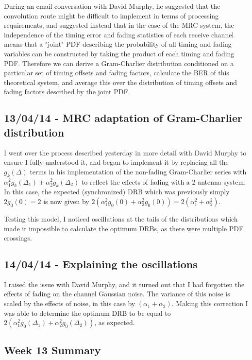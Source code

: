 During an email conversation with David Murphy, he suggested that the
convolution route might be difficult to implement in terms of processing
requirements, and suggested instead that in the case of the MRC system,
the independence of the timing error and fading statistics of each
receive channel means that a "joint" PDF describing the probability of
all timing and fading variables can be constructed by taking the product
of each timing and fading PDF. Therefore we can derive a Gram-Charlier
distribution conditioned on a particular set of timing offsets and
fading factors, calculate the BER of this theoretical system, and
average this over the distribution of timing offsets and fading factors
described by the joint PDF.

\subsection{13/04/14 - MRC adaptation of Gram-Charlier distribution}

I went over the process described yesterday in more detail with David Murphy to ensure I fully understood it,
and began to implement it by replacing all the $g_k(\Delta)$ terms in
his implementation of the non-fading Gram-Charlier series with
$\alpha_1^2 g_k(\Delta_1) + \alpha_2^2 g_k(\Delta_2)$ to reflect the
effects of fading with a 2 antenna system. In this case, the expected
(synchronized) DRB which was previously simply $2 g_0(0) = 2$ is now
given by
$2(\alpha_1^2 g_0(0) + \alpha_2^2 g_0(0)) = 2(\alpha_1^2 + \alpha_2^2)$.

Testing this model, I noticed oscillations at the tails of the
distributions which made it impossible to calculate the optimum DRBs, as
there were multiple PDF crossings.

\subsection{14/04/14 - Explaining the oscillations}

I raised the issue with David Murphy, and it turned out that I had forgotten the
effects of fading on the channel Gaussian noise. The variance of this
noise is scaled by the effects of noise, in this case by
$(\alpha_1 + \alpha_2)$. Making this correction I was able to determine
the optimum DRB to be equal to
$2(\alpha_1^2 g_0(\Delta_1) + \alpha_2^2 g_0(\Delta_2))$, as expected.

\subsection{Week 13 Summary}


